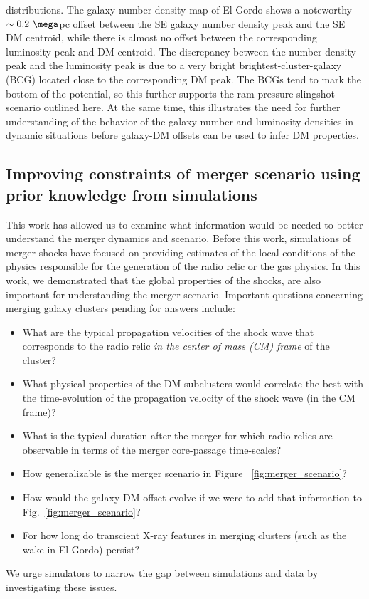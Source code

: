 \documentclass[ucdthesis.tex]{subfiles}
\begin{document}
    distributions. The galaxy number density map of El Gordo
     shows a noteworthy $\sim0.2~\mega$pc offset between the SE
    galaxy number density peak and the SE DM centroid, while there is almost no offset
    between the corresponding luminosity peak and DM centroid. The discrepancy
    between the number density peak and the luminosity peak is due to a very
    bright brightest-cluster-galaxy (BCG) located close to the corresponding DM peak.
    The BCGs tend to mark the bottom of the potential, so this further supports the
    ram-pressure slingshot scenario outlined here. At the same time, this
    illustrates the need for further understanding of the behavior of the
    galaxy number and luminosity densities in dynamic situations before
    galaxy-DM offsets can be used to infer DM properties. 
    \par 
    \subsection{Improving constraints of merger scenario using prior knowledge from simulations}
    This work has allowed us to examine
    what information would be needed to better understand the merger
    dynamics and scenario. Before this work, simulations of merger shocks have
    focused on providing estimates of the local conditions of the physics
    responsible for the generation of the radio relic or the gas physics. In this work, we demonstrated that the global
    properties of the shocks, are also important for understanding the merger scenario. 
    Important questions concerning merging galaxy
    clusters pending for answers include:  
    \begin{itemize}
    \item What are the typical propagation velocities of the shock wave that
    	corresponds to the radio relic {\it in the center of mass (CM) frame} of the cluster?
    \item What physical properties of the DM subclusters would correlate the
    	best with the time-evolution of the propagation velocity of the shock
    	wave (in the CM frame)?  
    \item What is the typical duration
    after the merger for which radio relics are observable in terms of the merger
    core-passage time-scales? 
    \item How generalizable is the merger scenario in Figure
    ~\ref{fig:merger_scenario}?  
    \item How would the galaxy-DM offset evolve if we were to add that information
    	to Fig.~\ref{fig:merger_scenario}?
    \item For how long do transcient X-ray features in merging clusters (such
    		as the wake in El Gordo) persist?
    \end{itemize}
    We urge simulators to narrow the gap between simulations and data by
    investigating these issues.
\end{document}
